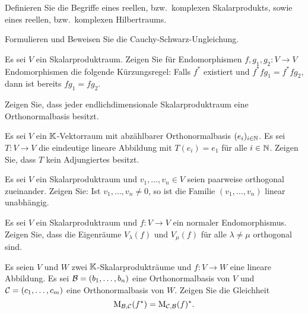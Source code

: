 \documentclass[a4paper,10pt]{scrartcl}
\begin{document}


\begin{question}
  Definieren Sie die Begriffe eines reellen, bzw.\ komplexen Skalarprodukts, sowie eines reellen, bzw.\ komplexen Hilbertraums.
\end{question}


\begin{question}
  Formulieren und Beweisen Sie die Cauchy-Schwarz-Ungleichung.
\end{question}


\begin{question}
  Es sei $V$ ein Skalarproduktraum.
  Zeigen Sie für Endomorphismen $f, g_1, g_2 \colon V \to V$ Endomorphismen die folgende Kürzungsregel:
  Falls $f^*$ existiert und $f^* f g_1 = f^* f g_2$, dann ist bereits $f g_1 = f g_2$.
\end{question}


\begin{question}
  Zeigen Sie, dass jeder endlichdimensionale Skalarproduktraum eine Orthonormalbasis besitzt.
\end{question}


\begin{question}
  Es sei $V$ ein $\mathbb{K}$-Vektorraum mit abzählbarer Orthonormalbasis $(e_i)_{i \in \mathbb{N}}$.
  Es sei $T \colon V \to V$ die eindeutige lineare Abbildung mit $T(e_i) = e_1$ für alle $i \in \mathbb{N}$.
  Zeigen Sie, dass $T$ kein Adjungiertes besitzt.
\end{question}



\begin{question}
  Es sei $V$ ein Skalarproduktraum und $v_1, \dotsc, v_n \in V$ seien paarweise orthogonal zueinander.
  Zeigen Sie: Ist $v_1, \dotsc, v_n \neq 0$, so ist die Familie $(v_1, \dotsc, v_n)$ linear unabhängig.
\end{question}


\begin{question}
  Es sei $V$ ein Skalarproduktraum und $f \colon V \to V$ ein normaler Endomorphismus.
  Zeigen Sie, dass die Eigenräume $V_\lambda(f)$ und $V_\mu(f)$ für alle $\lambda \neq \mu$ orthogonal sind.
\end{question}


\begin{question}
  Es seien $V$ und $W$ zwei $\mathbb{K}$-Skalarprodukträume und $f \colon V \to W$ eine lineare Abbildung.
  Es sei $\mathcal{B} = (b_1, \dotsc, b_n)$ eine Orthonormalbasis von $V$ und $\mathcal{C} = (c_1, \dotsc, c_m)$ eine Orthonormalbasis von $W$.
  Zeigen Sie die Gleichheit
  \[
      \operatorname{M}_{\mathcal{B}, \mathcal{C}}(f^*)
    = \operatorname{M}_{\mathcal{C}, \mathcal{B}}(f)^*.
  \]
\end{question}
\end{document}
